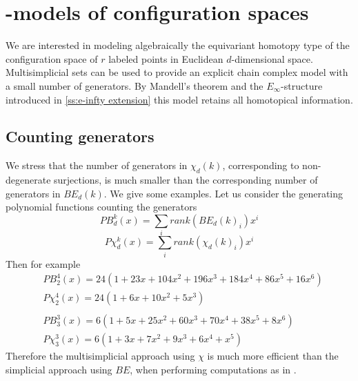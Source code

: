 
\section{\pdfEinfty-models of configuration spaces}

We are interested in modeling algebraically the equivariant homotopy type of the configuration space of $r$ labeled points in Euclidean $d$-dimensional space.
Multisimplicial sets can be used to provide an explicit chain complex model with a small number of generators.
By Mandell's theorem \cite{mandell2006homotopy_type} and the $E_\infty$-structure introduced in \cref{ss:e-infty extension} this model retains all homotopical information.





\subsection{Counting generators}

We stress that the number of generators in $\chi_d(k)$, corresponding to non-degenerate surjections, is much smaller than the corresponding number of generators in $BE_d(k)$.
We give some examples.
Let us consider the generating polynomial functions counting the generators
$$PB_d^k(x) = \sum_i rank(BE_d(k)_i) x^i $$ $$P\chi_d^k(x)=
\sum_i rank(\chi_d(k)_i) x^i$$
Then for example
\begin{align*}
	& PB_2^4(x)=24(1+23x+104x^2+196x^3+184x^4+86x^5+16x^6)\\
	& P\chi_2^4(x)=24(1+6x+10x^2+5x^3) \\
	& \\
	& PB_3^3(x) = 6(1+5x+25x^2+60x^3+70x^4+38x^5+8x^6 ) \\
	&  P\chi_3^3(x)= 6(1+3x+7x^2+9x^3+6x^4+x^5)
\end{align*}
Therefore the multisimplicial approach using $\chi$ is much more efficient than the simplicial
approach using $BE$, when performing computations as in \cite{formality}.

